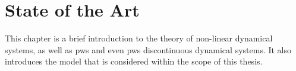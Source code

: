 \chapter{State of the Art}
\label{chap:state}

This chapter is a brief introduction to the theory of non-linear dynamical systems, as well as \gls{pws} and even \gls{pws} discontinuous dynamical systems.
It also introduces the model that is considered within the scope of this thesis.







